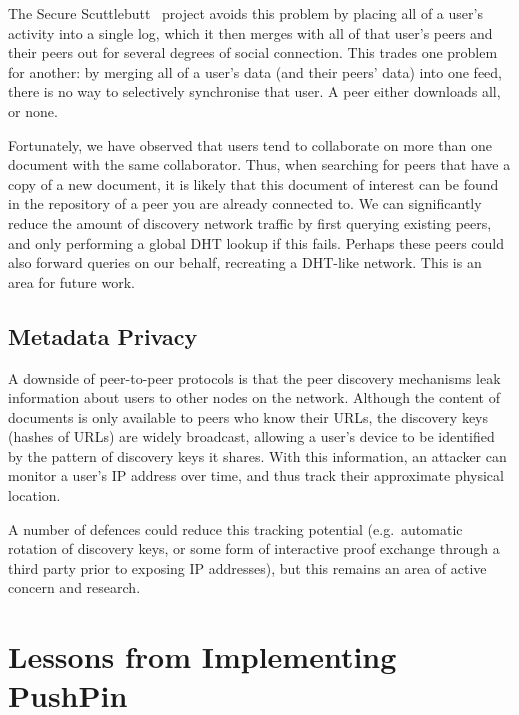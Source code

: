 \documentclass[sigplan,10pt]{acmart}
\begin{document}

The Secure Scuttlebutt~\cite{Tarr:2019ba} project avoids this problem by placing all of a user's activity into a single log, which it then merges with all of that user's peers and their peers out for several degrees of social connection. This trades one problem for another: by merging all of a user's data (and their peers' data) into one feed, there is no way to selectively synchronise that user. A peer either downloads all, or none.

Fortunately, we have observed that users tend to collaborate on more than one document with the same collaborator.
Thus, when searching for peers that have a copy of a new document, it is likely that this document of interest can be found in the repository of a peer you are already connected to.
We can significantly reduce the amount of discovery network traffic by first querying existing peers, and only performing a global DHT lookup if this fails.
Perhaps these peers could also forward queries on our behalf, recreating a DHT-like network.
This is an area for future work.

\subsection{Metadata Privacy}

A downside of peer-to-peer protocols is that the peer discovery mechanisms leak information about users to other nodes on the network.
Although the content of documents is only available to peers who know their URLs, the discovery keys (hashes of URLs) are widely broadcast, allowing a user's device to be identified by the pattern of discovery keys it shares.
With this information, an attacker can monitor a user's IP address over time, and thus track their approximate physical location.

A number of defences could reduce this tracking potential (e.g.\ automatic rotation of discovery keys, or some form of interactive proof exchange through a third party prior to exposing IP addresses), but this remains an area of active concern and research.

\section{Lessons from Implementing PushPin}\label{sec:lessons}

\end{document}
